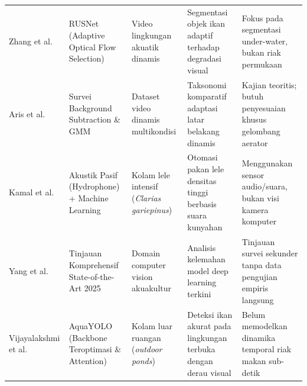 \begin{small}
\begin{longtable}{p{2.6cm} p{3.2cm} p{2.8cm} p{3.4cm} p{2.6cm}}
{Zhang et al.~\cite{Zhang2024}} & RUSNet (Adaptive Optical Flow Selection) & Video lingkungan akuatik dinamis & Segmentasi objek ikan adaptif terhadap degradasi visual & Fokus pada segmentasi under-water, bukan riak permukaan \\
\addlinespace

{Aris et al.~\cite{Aris2023}} & Survei Background Subtraction \& GMM & Dataset video dinamis multikondisi & Taksonomi komparatif adaptasi latar belakang dinamis & Kajian teoritis; butuh penyesuaian khusus gelombang aerator \\
\addlinespace

{Kamal et al.~\cite{Kamal2025}} & Akustik Pasif (Hydrophone) + Machine Learning & Kolam lele intensif (\textit{Clarias gariepinus}) & Otomasi pakan lele densitas tinggi berbasis suara kunyahan & Menggunakan sensor audio/suara, bukan visi kamera komputer \\
\addlinespace

{Yang et al.~\cite{Yang2025}} & Tinjauan Komprehensif State-of-the-Art 2025 & Domain computer vision akuakultur & Analisis kelemahan model deep learning terkini & Tinjauan survei sekunder tanpa data pengujian empiris langsung \\
\addlinespace

{Vijayalakshmi et al.~\cite{Vijayalakshmi2025}} & AquaYOLO (Backbone Teroptimasi \& Attention) & Kolam luar ruangan (\textit{outdoor ponds}) & Deteksi ikan akurat pada lingkungan terbuka dengan derau visual & Belum memodelkan dinamika temporal riak makan sub-detik \\

\end{longtable}
\end{small}
